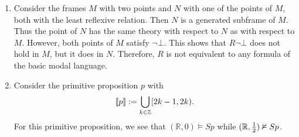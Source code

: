 \documentclass{article}
\begin{document}
\begin{ex}
\begin{enumerate}
\item Consider the frames $M$ with two points and $N$ with one of the points of $M$, both with the least reflexive relation. Then $N$ is a generated subframe of $M$. Thus the point of $N$ has the same theory with respect to $N$ as with respect to $M$. However, both points of $M$ satisfy $\neg\bot$. This shows that $R\neg\bot$ does not hold in $M$, but it does in $N$. Therefore, $R$ is not equivalent to any formula of the basic modal language.
\item Consider the primitive proposition $p$ with 
\begin{equation*}
\llbracket p\rrbracket:=\bigcup_{k\in\mathbb{Z}}[2k-1,2k).
\end{equation*} 
For this primitive proposition, we see that
$(\mathbb{R},0)\models Sp$ while $(\mathbb{R},\frac{1}{2})\nvDash Sp$.


\end{enumerate}
\end{ex}
\end{document}
